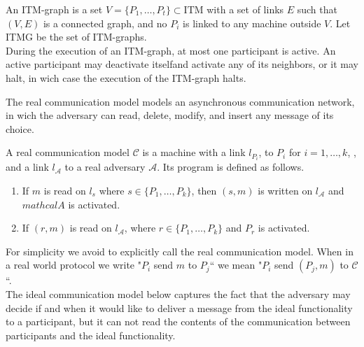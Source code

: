 \documentclass{acm_proc_article-sp}
\begin{document}

\begin{defAppendix}
An ITM-graph is a set $V = \{P_1, \ldots, P_t\} \subset \textrm{ITM}$ with a set of
links $E$ such that $(V, E)$ is a connected graph, and no $P_i$ is linked to any
machine outside $V$. Let ITMG be the set of ITM-graphs.\\
During the execution of an ITM-graph, at most one participant is active. An active
participant may deactivate itselfand activate any of its neighbors, or it may halt, in
wich case the execution of the ITM-graph halts.
\end{defAppendix}

The real communication model models an asynchronous communication network, in wich the
adversary can read, delete, modify, and insert any message of its choice. 

\begin{defAppendix}
A real communication model $\mathcal{C}$ is a machine with a link $l_{P_i}$, to $P_i$
for $i = 1, \ldots, k$, , and a link $l_\mathcal{A}$ to a real adversary $\mathcal{A}$.
Its program is defined as follows.
\begin{enumerate}
  \item If $m$ is read on $l_s$ where $s \in \{P_1, \ldots, P_k\}$, then $(s, m)$ is
        written on $l_\mathcal{A}$ and $mathcal{A}$ is activated.
  \item If $(r, m)$ is read on $l_\mathcal{A}$, where $r \in \{P_1, \ldots, P_k\}$
        and $P_r$ is activated.
\end{enumerate}
\end{defAppendix}

For simplicity
we avoid to explicitly call the real communication model. When in a real world
protocol we write "$P_i$ send $m$ to $P_j$`` we mean "$P_i$ send $(P_j,m)$ to
$\mathcal{C}$``.\\
The ideal communication model below captures the fact that the adversary may decide if
and when it would like to deliver a message from the ideal functionality to a
participant, but it can not read the contents of the communication between participants
and the ideal functionality.
\end{document}
